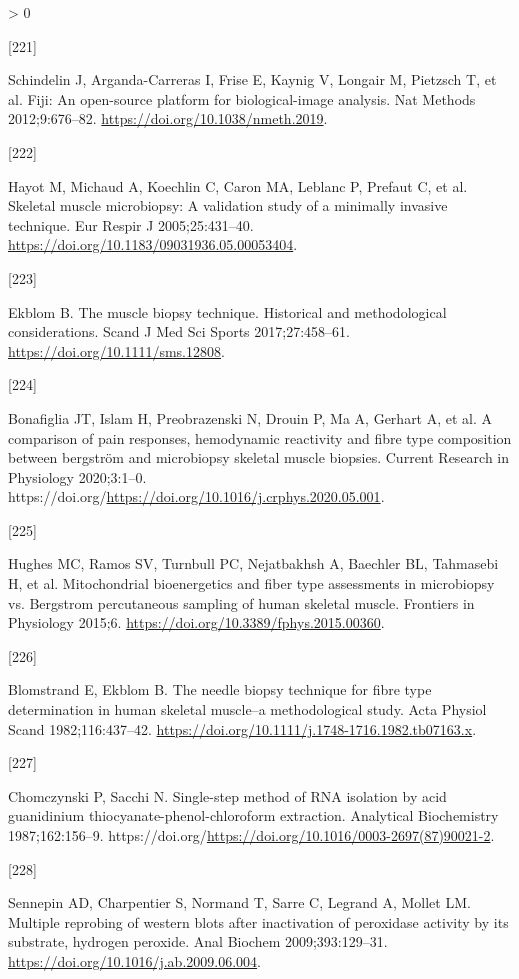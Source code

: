 \documentclass[twoside,10pt]{gihclass} %
\newlength{\cslhangindent}
\newlength{\csllabelwidth}
\newenvironment{CSLReferences}[3] %
 {%
  \setlength{\parindent}{0pt}
  \ifodd #1 \everypar{\setlength{\hangindent}{\cslhangindent}}\ignorespaces\fi
  \ifnum #2 > 0
  \setlength{\parskip}{#2\baselineskip}
  \fi
 }%
 {}
\newcommand{\CSLLeftMargin}[1]{\parbox[t]{\maxof{\widthof{#1}}{\csllabelwidth}}{#1}}
\newcommand{\CSLRightInline}[1]{\parbox[t]{\linewidth}{#1}}
\begin{document}
\begin{CSLReferences}{0}{0}
\leavevmode\hypertarget{ref-RN2561}{}%
\CSLLeftMargin{{[}221{]} }
\CSLRightInline{Schindelin J, Arganda-Carreras I, Frise E, Kaynig V, Longair M, Pietzsch T, et al. Fiji: An open-source platform for biological-image analysis. Nat Methods 2012;9:676--82. \url{https://doi.org/10.1038/nmeth.2019}.}

\leavevmode\hypertarget{ref-RN824}{}%
\CSLLeftMargin{{[}222{]} }
\CSLRightInline{Hayot M, Michaud A, Koechlin C, Caron MA, Leblanc P, Prefaut C, et al. Skeletal muscle microbiopsy: A validation study of a minimally invasive technique. Eur Respir J 2005;25:431--40. \url{https://doi.org/10.1183/09031936.05.00053404}.}

\leavevmode\hypertarget{ref-RN2549}{}%
\CSLLeftMargin{{[}223{]} }
\CSLRightInline{Ekblom B. The muscle biopsy technique. Historical and methodological considerations. Scand J Med Sci Sports 2017;27:458--61. \url{https://doi.org/10.1111/sms.12808}.}

\leavevmode\hypertarget{ref-RN2553}{}%
\CSLLeftMargin{{[}224{]} }
\CSLRightInline{Bonafiglia JT, Islam H, Preobrazenski N, Drouin P, Ma A, Gerhart A, et al. A comparison of pain responses, hemodynamic reactivity and fibre type composition between bergström and microbiopsy skeletal muscle biopsies. Current Research in Physiology 2020;3:1--0. https://doi.org/\url{https://doi.org/10.1016/j.crphys.2020.05.001}.}

\leavevmode\hypertarget{ref-RN2552}{}%
\CSLLeftMargin{{[}225{]} }
\CSLRightInline{Hughes MC, Ramos SV, Turnbull PC, Nejatbakhsh A, Baechler BL, Tahmasebi H, et al. Mitochondrial bioenergetics and fiber type assessments in microbiopsy vs. Bergstrom percutaneous sampling of human skeletal muscle. Frontiers in Physiology 2015;6. \url{https://doi.org/10.3389/fphys.2015.00360}.}

\leavevmode\hypertarget{ref-RN874}{}%
\CSLLeftMargin{{[}226{]} }
\CSLRightInline{Blomstrand E, Ekblom B. The needle biopsy technique for fibre type determination in human skeletal muscle--a methodological study. Acta Physiol Scand 1982;116:437--42. \url{https://doi.org/10.1111/j.1748-1716.1982.tb07163.x}.}

\leavevmode\hypertarget{ref-RN2672}{}%
\CSLLeftMargin{{[}227{]} }
\CSLRightInline{Chomczynski P, Sacchi N. Single-step method of RNA isolation by acid guanidinium thiocyanate-phenol-chloroform extraction. Analytical Biochemistry 1987;162:156--9. https://doi.org/\url{https://doi.org/10.1016/0003-2697(87)90021-2}.}

\leavevmode\hypertarget{ref-RN1930}{}%
\CSLLeftMargin{{[}228{]} }
\CSLRightInline{Sennepin AD, Charpentier S, Normand T, Sarre C, Legrand A, Mollet LM. Multiple reprobing of western blots after inactivation of peroxidase activity by its substrate, hydrogen peroxide. Anal Biochem 2009;393:129--31. \url{https://doi.org/10.1016/j.ab.2009.06.004}.}


\end{CSLReferences}
\end{document}
